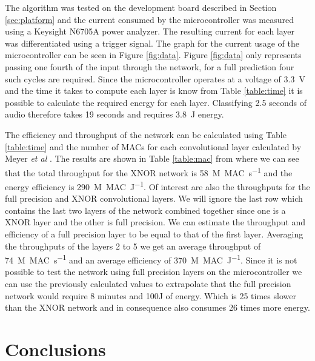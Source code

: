 \documentclass[conference]{IEEEtran}
\begin{document}
The algorithm was tested on the development board described in Section \ref{sec:platform} and the current consumed by the microcontroller was measured using a Keysight N6705A power analyzer. The resulting current for each layer was differentiated using a trigger signal. The graph for the current usage of the microcontroller can be seen in Figure \ref{fig:data}. Figure \ref{fig:data} only represents passing one fourth of the input through the network, for a full prediction four such cycles are required. Since the microcontroller operates at a voltage of \SI{3.3}{\volt} and the time it takes to compute each layer is know from Table \ref{table:time} it is possible to calculate the required energy for each layer. Classifying 2.5 seconds of audio therefore takes 19 seconds and requires \SI{3.8}{\joule} energy.

The efficiency and throughput of the network can be calculated using Table \ref{table:time} and the number of MACs for each convolutional layer calculated by Meyer \textit{et al} \cite{lukas}. The results are shown in Table \ref{table:mac} from where we can see that the total throughput for the XNOR network is \SI{58}{M MAC\per\second} and the energy efficiency is \SI{290}{M MAC\per\joule}. Of interest are also the throughputs for the full precision and XNOR convolutional layers. We will ignore the last row which contains the last two layers of the network combined together since one is a XNOR layer and the other is full precision. We can estimate the throughput and efficiency of a full precision layer to be equal to that of the first layer. Averaging the throughputs of the layers 2 to 5 we get an average throughput of \SI{74}{M MAC\per\second} and an average efficiency of \SI{370}{M MAC\per\joule}. Since it is not possible to test the network using full precision layers on the microcontroller we can use the previously calculated values to extrapolate that the full precision network would require 8 minutes and 100J of energy. Which is 25 times slower than the XNOR network and in consequence also consumes 26 times more energy.

\section{Conclusions}
\end{document}
